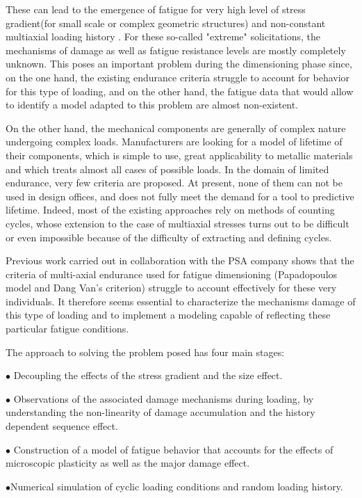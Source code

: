 \documentclass[3p,times,procedia,number]{elsarticle}
\begin{document}
These can lead to the emergence of fatigue for
very high level of stress gradient(for small scale or complex geometric structures) and non-constant multiaxial loading history
. For these so-called "extreme" solicitations, the mechanisms of damage
as well as fatigue resistance levels are mostly completely unknown.
This poses an important problem during the dimensioning phase since, on the one hand, the
existing endurance criteria struggle to account for behavior for this type of
loading, and on the other hand, the fatigue data that would allow to identify a model
adapted to this problem are almost non-existent.

On the other hand, the mechanical components are generally of complex nature undergoing
complex loads. Manufacturers are looking for a model of lifetime
of their components, which is simple to use, great applicability to metallic materials
 and which treats almost all cases of possible loads. In the domain of
limited endurance, very few criteria are proposed. At present, none of them
can not be used in design offices, and does not fully meet the demand for a tool to
predictive lifetime. Indeed, most of the existing approaches rely on
methods of counting cycles, whose extension to the case of multiaxial stresses turns out to be
difficult or even impossible because of the difficulty of extracting and defining cycles.

Previous work carried out in collaboration with the PSA company shows that the criteria
of multi-axial endurance used for fatigue dimensioning (Papadopoulos model
and Dang Van's criterion) struggle to account effectively for these very
individuals. It therefore seems essential to characterize the mechanisms
damage of this type of loading and to implement a modeling
capable of reflecting these particular fatigue conditions.

The approach to solving the problem posed has four main stages:

$\bullet$ Decoupling the effects of the stress gradient and the size effect.

$\bullet$ Observations of the associated damage mechanisms during loading, by
understanding the non-linearity of damage accumulation and the history dependent sequence effect.

$\bullet$ Construction of a model of fatigue behavior that accounts for the effects of
microscopic plasticity as well as the major damage effect. 

$\bullet$Numerical simulation of cyclic loading conditions and random loading history.
\end{document}
